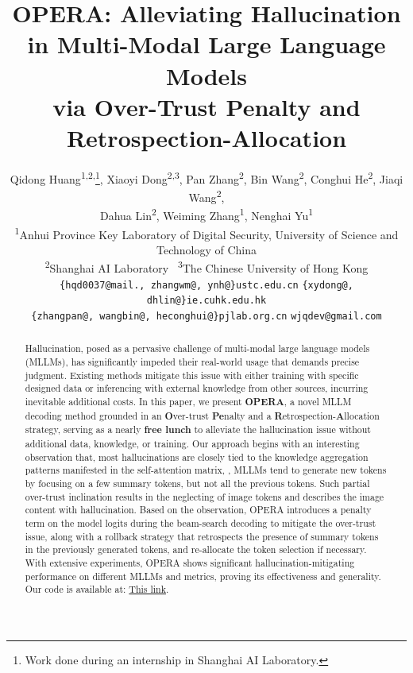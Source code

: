 \documentclass[10pt,twocolumn,letterpaper]{article}
\title{OPERA: Alleviating Hallucination in Multi-Modal Large Language Models \\ via Over-Trust Penalty and Retrospection-Allocation }
\author{
Qidong Huang\textsuperscript{\rm 1,2,}\thanks{Work done during an internship in Shanghai AI Laboratory.},
Xiaoyi Dong\textsuperscript{\rm 2,3},
Pan Zhang\textsuperscript{\rm 2},
Bin Wang\textsuperscript{\rm 2},
Conghui He\textsuperscript{\rm 2},
Jiaqi Wang\textsuperscript{\rm 2},\\
Dahua Lin\textsuperscript{\rm 2},
Weiming Zhang\textsuperscript{\rm 1},
Nenghai Yu\textsuperscript{\rm 1}\\
\textsuperscript{\rm 1}Anhui Province Key Laboratory of Digital Security, University of Science and Technology of China \\
\textsuperscript{\rm 2}Shanghai AI Laboratory \quad \
\textsuperscript{\rm 3}The Chinese University of Hong Kong \\
{\tt\small \{hqd0037@mail., zhangwm@, ynh@\}ustc.edu.cn}\quad
{\tt\small \{xydong@, dhlin@\}ie.cuhk.edu.hk} \\
{\tt\small\{zhangpan@, wangbin@, heconghui@\}pjlab.org.cn} \quad
{\tt\small wjqdev@gmail.com}
}
\begin{document}
\maketitle
%     
% 
% 
% 
% 
% 
% 


\begin{abstract}
Hallucination, posed as a pervasive challenge of multi-modal large language models (MLLMs), has significantly impeded their real-world usage that demands precise judgment.
Existing methods mitigate this issue with either training with specific designed data or inferencing with external knowledge from other sources, incurring inevitable additional costs. 
In this paper, we present \textbf{OPERA}, a novel MLLM decoding method grounded in an \textbf{O}ver-trust \textbf{Pe}nalty and a \textbf{R}etrospection-\textbf{A}llocation strategy, serving as a nearly \textbf{free lunch} to alleviate the hallucination issue without additional data, knowledge, or training. 
Our approach begins with an interesting observation that, most hallucinations are closely tied to the knowledge aggregation patterns manifested in the self-attention matrix, \ie, 
MLLMs tend to generate new tokens by focusing on a few summary tokens, but not all the previous tokens. 
Such partial over-trust inclination results in the neglecting of image tokens and describes the image content with hallucination.
Based on the observation, OPERA introduces a penalty term on the model logits during the beam-search decoding to mitigate the over-trust issue, along with a rollback strategy that retrospects the presence of summary tokens in the previously generated tokens, and re-allocate the token selection if necessary. 
With extensive experiments, OPERA shows significant hallucination-mitigating performance on different MLLMs and metrics, proving its effectiveness and generality.
Our code is available at: \href{https://github.com/shikiw/OPERA}{This link}.


\end{abstract}
\end{document}
